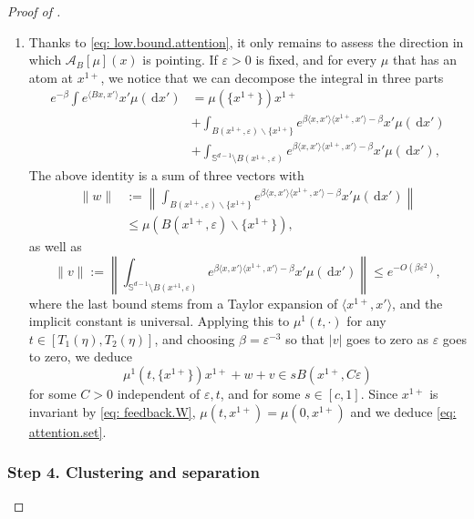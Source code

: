 \documentclass[a4paper,11pt]{article}
\theoremstyle{plain}
\newcommand{\diff}{\, \mathrm{d}}
\renewcommand{\S}{\mathbb{S}^{d-1}}
\newcommand{\bB}{\bm{\mathit{B}}}
\renewcommand{\leq}{\leqslant}
\numberwithin{equation}{section}
\begin{document}
\begin{proof}[Proof of ]
\begin{enumerate}
\item  Thanks to \eqref{eq: low.bound.attention}, it only remains to assess the direction in which $\mathscr{A}_{\bB}[\mu](x)$ is pointing. If $\varepsilon>0$ is fixed, and for every $\mu$ that has an atom at $x^{1+}$, we notice that we can decompose the integral in three parts
\begin{align*}
    e^{-\beta}\int e^{\langle \bB x,x'\rangle }x'\mu(\diff x')&=\mu(\{x^{1+}\})x^{1+}\\
    &+\int_{B(x^{1+},\varepsilon)\backslash \{x^{1+}\}}  e^{\beta \langle x,x'\rangle\langle x^{1+},x'\rangle-\beta }x'\mu(\diff x')\\
    &+\int_{\S\setminus B(x^{1+},\varepsilon)}  e^{\beta \langle x,x'\rangle\langle x^{1+},x'\rangle-\beta }x'\mu(\diff x'),
\end{align*}
The above identity is a sum of three vectors with
\begin{align*}
    \|w\|&:=\left\|\int_{B(x^{1+},\varepsilon)\backslash \{x^{1+}\}}  e^{\beta \langle x,x'\rangle\langle x^{1+},x'\rangle-\beta }x'\mu(\diff x')\right\|\\
    &\leq \mu\left(B(x^{1+},\varepsilon)\backslash \{x^{1+}\}\right),
\end{align*}
as well as
\begin{equation*}
    \|v\|:=\left\|\int_{\S\setminus B(x^{+1},\varepsilon)}  e^{\beta \langle x,x'\rangle\langle x^{1+},x'\rangle-\beta }x'\mu(\diff x')\right\|\leq e^{-O(\beta\varepsilon^2)},
\end{equation*}
where the last bound stems from a Taylor expansion of $\langle x^{1+},x'\rangle$, and the implicit constant is universal. Applying this to $\mu^1(t,\cdot)$ for any $t\in[T_1(\eta), T_2(\eta)]$, and choosing $\beta=\varepsilon^{-3}$ so that $|v|$ goes to zero as $\varepsilon$ goes to zero, we deduce
\begin{equation*}
    \mu^1(t, \{x^{1+}\})x^{1+}+w+v\in sB(x^{1+},C\varepsilon)
\end{equation*}
for some $C>0$ independent of $\varepsilon, t$, and for some $s\in[c, 1]$. Since $x^{1+}$ is invariant by \eqref{eq: feedback.W}, $\mu(t,x^{1+})=\mu(0,x^{1+})$ and we deduce \eqref{eq: attention.set}.
\end{enumerate}


\subsubsection*{Step 4. Clustering and separation} 


\end{proof}
\end{document}
